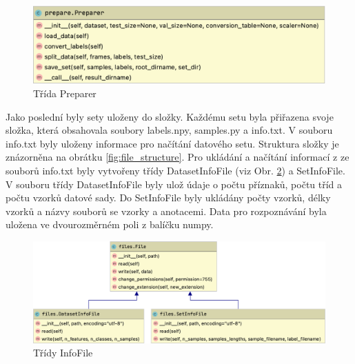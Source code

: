 \documentclass[FM,BP]{tulthesis}
\begin{document}
\begin{figure}[h]
\centerline{\includegraphics[scale=.25,keepaspectratio]{prepare.png}}
\caption{Třída Preparer}
\label{fig:preparer}
\end{figure}
\FloatBarrier

Jako poslední byly sety uloženy do složky. Každému setu byla přiřazena svoje složka, která obsahovala soubory labels.npy, samples.py a info.txt. V souboru info.txt byly uloženy informace pro načítání datového setu. Struktura složky je znázorněna na obrátku \ref{fig:file_structure}. Pro ukládání a načítání informací z ze souborů info.txt byly vytvořeny třídy DatasetInfoFile (viz Obr. \ref{fig:info_files}) a SetInfoFile. V souboru třídy DatasetInfoFile byly ulož údaje o počtu příznaků, počtu tříd a počtu vzorků datové sady. Do SetInfoFile byly ukládány počty vzorků, délky vzorků a názvy souborů se vzorky a anotacemi. Data pro rozpoznávání byla uložena ve dvourozměrném poli z balíčku numpy.

\begin{figure}[h]
\centerline{\includegraphics[scale=.25]{files-info.png}}
\caption{Třídy InfoFile}
\label{fig:info_files}
\end{figure}
\FloatBarrier
\end{document}
